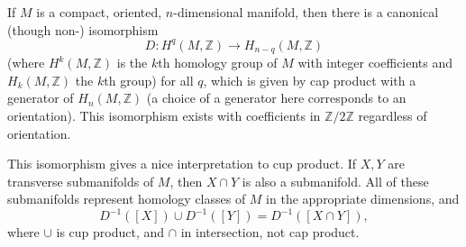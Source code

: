 \documentclass[12pt]{article}
\def\Z{\mathbb{Z}}
\begin{document}
If $M$ is a compact, oriented, $n$-dimensional manifold, then there is a canonical (though non-) isomorphism
$$D:H^q(M,\Z)\to H_{n-q}(M,\Z)$$ (where $H^k(M,\Z)$ is the $k$th homology group of $M$ with integer coefficients and $H_k(M,\Z)$ the $k$th  group) for all $q$, which is given by cap product with a generator of $H_n(M,\Z)$
(a choice of a generator here corresponds to an orientation).  This isomorphism exists with
coefficients in $\mathbb{Z}/2\mathbb{Z}$ regardless of orientation.

This isomorphism gives a nice interpretation to cup product.  If $X,Y$ are transverse submanifolds of $M$, then $X\cap Y$ is also a submanifold.  All of these submanifolds represent homology classes of $M$ in the appropriate dimensions, and $$D^{-1}([X])\cup D^{-1}([Y])=D^{-1}([X\cap Y]),$$ where $\cup$ is cup product, and $\cap$ in intersection, not cap product.
\end{document}
